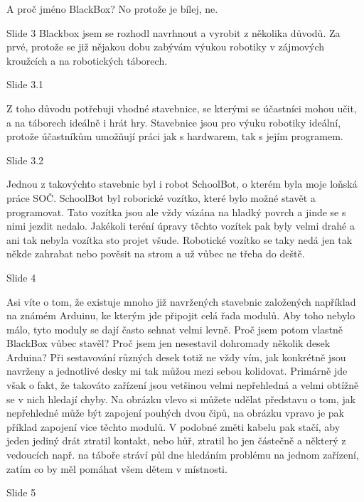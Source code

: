 A proč jméno BlackBox? No protože je bílej, ne. %


Slide 3 
Blackbox jsem se rozhodl navrhnout a vyrobit z několika důvodů. Za prvé, protože se již nějakou dobu zabývám 
výukou robotiky v zájmových kroužcích a na robotických táborech. 

    Slide 3.1

    Z toho důvodu potřebuji 
    vhodné stavebnice, se kterými se účastníci mohou učit, a na táborech ideálně i hrát hry.
    Stavebnice jsou pro výuku robotiky ideální, protože účastníkům umožňují práci jak 
    s hardwarem, tak s jejím programem. %

    Slide 3.2

    Jednou z takovýchto stavebnic byl i robot SchoolBot, o kterém byla moje loňská práce SOČ.
    SchoolBot byl roborické vozítko, které bylo možné stavět a programovat.  
    Tato vozítka jsou ale vždy vázána na hladký povrch a jinde se s nimi jezdit nedalo.
    Jakékoli teréní úpravy těchto vozítek pak byly velmi drahé a ani tak nebyla vozítka sto projet všude.
    Robotické vozítko se taky nedá jen tak někde zahrabat nebo pověsit na strom a už vůbec ne třeba do deště. 


Slide 4

Asi víte o tom, že existuje mnoho již navržených stavebnic založených například na známém Arduinu, 
ke kterým jde připojit celá řada modulů. Aby toho nebylo málo, tyto moduly se dají často sehnat velmi levně. 
Proč jsem potom vlastně BlackBox vůbec stavěl? Proč jsem jen nesestavil dohromady několik desek Arduina? 
Při sestavování různých desek
totiž ne vždy vím, jak konkrétně jsou navrženy a jednotlivé desky mi tak můžou mezi sebou kolidovat.
Primárně jde však o fakt, že takováto zařízení jsou vetšinou velmi nepřehledná a velmi obtížně se v nich hledají chyby. 
Na obrázku vlevo si můžete udělat představu o tom, jak nepřehledné může být zapojení pouhých dvou čipů, 
na obrázku vpravo je pak příklad zapojení vice těchto modulů. V podobné změti kabelu pak stačí, aby jeden jediný drát 
ztratil kontakt, nebo hůř, ztratil ho jen částečně a některý z vedoucích např. na táboře stráví půl dne hledáním problému 
na jednom zařízení, zatím co by měl pomáhat všem dětem v místnosti.


Slide 5

